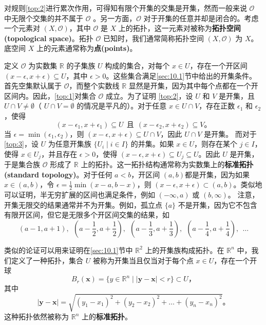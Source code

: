 	对规则\ref{top:2}进行累次作用，可得知有限个开集的交集是开集，然而一般来说 $\mathcal{O}$ 中无限个交集的并不属于 $\mathcal{O}$ 。另一方面，$\mathcal{O}$ 对于开集的任意并却是闭合的。考虑一个元素对 $(X,\mathcal{O} )$，其中 $\mathcal{O}$ 是 $X$ 上的拓扑，这一元素对被称为\textbf{拓扑空间(topological space)}。拓扑 $\mathcal{O}$ 已知时，我们通常简称拓扑空间 $(X,\mathcal{O} )$ 为 $X$。底空间 $X$ 上的元素通常称为\textbf{点(points)}。

\begin{eg}\label{eg:10.1}
 	定义 $\mathcal{O}$ 为实数集 $\mathbb{R}$ 的子集族 $U$ 构成的集合，对每个 $x\in U$，存在一个开区间 $(x-\epsilon ,x+\epsilon )\subseteq U$，其中 $\epsilon  >0$。这些集合满足\ref{sec:10.1}节中给出的开集条件。首先空集默认属于 $\mathcal{O}$，而整个实数线 $\mathbb{R}$ 显然是开集，因为其中每个点都在一个开区间内。因此，\ref{top:1}对集合 $\mathcal{O}$ 成立。为了证明 \ref{top:2}，设 $U$ 和 $V$ 是开集，且 $U\cap V\neq \emptyset $（ $U\cap V=\emptyset $ 的情况是平凡的）。对于任意 $x\in U\cap V$，存在正数 $\epsilon _{1}$ 和 $\epsilon _{2}$，使得
\begin{equation*}
    (x-\epsilon _{1} ,x+\epsilon _{1} )\subseteq U\ \ \text{且} \ \ (x-\epsilon _{2} ,x+\epsilon _{2} )\subseteq V。
\end{equation*}
当 $\epsilon =\min (\epsilon _{1} ,\epsilon _{2} )$，则 $(x-\epsilon ,x+\epsilon )\subseteq U\cap V$，因此 $U\cap V$ 是开集。
	而对于\ref{top:3}，设 $U$ 为任意开集族 $\{U_{i} \mid i\in I\}$ 的并集。如果 $x\in U$，则存在某个 $j\in I$，使得 $x\in U_{j}$，并且存在 $\epsilon  >0$，使得 $(x-\epsilon ,x+\epsilon )\subseteq U_{j} \subseteq U$。因此 $U$ 是开集，于是集合族 $\mathcal{O}$ 形成了 $\mathbb{R}$ 上的拓扑。这一拓扑结构通常称为实数集上的\textbf{标准拓扑(standard topology)}。对于任何 $a< b$，开区间 $(a,b)$都是开集，因为如果 $x\in (a,b)$，令 $\epsilon =\frac{1}{2}\min (x-a,b-x)$，则 $(x-\epsilon ,x+\epsilon )\subset (a,b)$。类似地可以证明，半无穷扩展的区间也满足条件，例如 $(-\infty ,a)$ 或 $(b,\infty )$。
	注意，开集无限交的结果通常并不为开集。例如，孤立点 $\{a\}$ 不是开集，因为它不包含有限开区间，但它是无限多个开区间交集的结果，如
\begin{equation*}
    (a-1,a+1),\ \ (a-\frac{1}{2} ,a+\frac{1}{2} ),\ \ (a-\frac{1}{3} ,a+\frac{1}{3} ),\ \ (a-\frac{1}{4} ,a+\frac{1}{4} ),\ \ \dotsc 
\end{equation*}
\end{eg}
类似的论证可以用来证明在\ref{sec:10.1}节中 $\mathbb{R}^{2}$ 上的开集族构成拓扑。在 $\mathbb{R}^{n}$ 中，我们定义了一种拓扑，集合 $U$ 被称为开集当且仅当对于每个点 $x\in U$，存在一个开球
\begin{equation*}
    B_{r} (\mathbf{x} )=\{y\in \mathbb{R}^{n} \mid | \mathbf{y} -\mathbf{x}| < r\}\subset U，
\end{equation*}
其中
\begin{equation*}
    |\mathbf{y} -\mathbf{x} |=\sqrt{(y_{1} -x_{1} )^{2} +(y_{2} -x_{2} )^{2} +\dotsc +(y_{n} -x_{n} )^{2}} 。
\end{equation*}
这种拓扑依然被称为 $\mathbb{R}^{n}$ 上的\textbf{标准拓扑}。	

